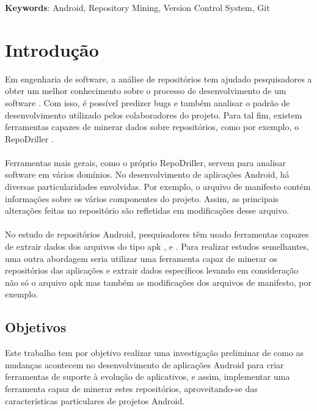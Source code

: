 \documentclass[a4paper,12pt]{article}
\numberwithin{figure}{section}
\begin{document}
\textbf{Keywords}: Android, Repository Mining, Version Control System, Git

\newpage

\tableofcontents

\newpage
\section{Introdução}

Em engenharia de software, a análise de repositórios tem ajudado pesquisadores a
obter um melhor conhecimento sobre o processo de desenvolvimento de um
software \cite{miningGit}. Com isso, é possível predizer bugs e também analisar o padrão de
desenvolvimento utilizado pelos colaboradores do projeto. Para tal fim, existem
ferramentas capazes de minerar dados sobre repositórios, como por exemplo, o
RepoDriller \cite{repodriller}.\\
\\
Ferramentas mais gerais, como o próprio RepoDriller, servem para analisar
software em vários domínios. No desenvolvimento de aplicações Android, há
diversas particularidades envolvidas. Por exemplo, o arquivo de manifesto contém
informações sobre os vários componentes do projeto. Assim, as principais
alterações feitas no repositório são refletidas em modificações desse arquivo.\\
\\
No estudo de repositórios Android, pesquisadores têm usado ferramentas capazes
de extrair dados dos arquivos do tipo apk \cite{Calciati}, \cite{WhoAdded} e \cite{YLyu}. Para realizar estudos
semelhantes, uma outra abordagem seria utilizar uma ferramenta capaz de
minerar os repositórios das aplicações e extrair dados específicos levando em
consideração não só o arquivo apk mas também as modificações dos arquivos de
manifesto, por exemplo.\\



\subsection{Objetivos}

Este trabalho tem por objetivo realizar uma investigação preliminar de como as
mudanças acontecem no desenvolvimento de aplicações Android para criar
ferramentas de suporte à evolução de aplicativos, e assim, implementar uma
ferramenta capaz de minerar estes repositórios, aproveitando-se das
características particulares de projetos Android.\\
\end{document}

